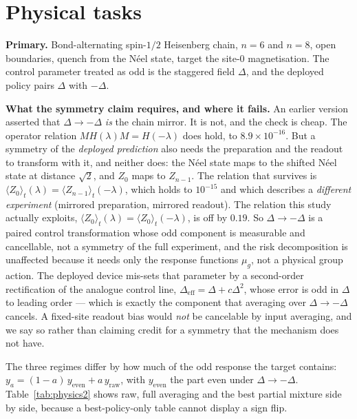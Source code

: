 \documentclass{article}
\begin{document}
\section{Physical tasks}
\label{sec:physics}

\textbf{Primary.} Bond-alternating spin-$1/2$ Heisenberg chain, $n=6$ and $n=8$, open boundaries,
quench from the N\'eel state, target the site-0 magnetisation. The control parameter treated as odd
is the staggered field $\Delta$, and the deployed policy pairs $\Delta$ with $-\Delta$.

\textbf{What the symmetry claim requires, and where it fails.} An earlier version asserted that
$\Delta\to-\Delta$ \emph{is} the chain mirror. It is not, and the check is cheap. The operator
relation $M H(\lambda) M = H(-\lambda)$ does hold, to $8.9\times10^{-16}$. But a symmetry of the
\emph{deployed prediction} also needs the preparation and the readout to transform with it, and
neither does: the N\'eel state maps to the shifted N\'eel state at distance $\sqrt{2}$, and
$Z_0$ maps to $Z_{n-1}$. The relation that survives is
$\langle Z_0\rangle_t(\lambda)=\langle Z_{n-1}\rangle_t(-\lambda)$, which holds to $10^{-15}$ and which describes a
\emph{different experiment} (mirrored preparation, mirrored readout). The relation this study
actually exploits, $\langle Z_0\rangle_t(\lambda)=\langle Z_0\rangle_t(-\lambda)$, is off by $0.19$. So
$\Delta\to-\Delta$ is a paired control transformation whose odd component is measurable and
cancellable, not a symmetry of the full experiment, and the risk decomposition is unaffected because
it needs only the response functions $\mu_g$, not a physical group action. The deployed device mis-sets that parameter by a second-order rectification of
the analogue control line, $\Delta_{\mathrm{eff}}=\Delta+c\Delta^2$, whose error is odd in $\Delta$
to leading order --- which is exactly the component that averaging over $\Delta\to-\Delta$ cancels.
A fixed-site readout bias would \emph{not} be cancelable by input averaging, and we say so rather
than claiming credit for a symmetry that the mechanism does not have.

The three regimes differ by how much of the odd response the target contains:
$y_a=(1-a)\,y_{\mathrm{even}}+a\,y_{\mathrm{raw}}$, with $y_{\mathrm{even}}$ the part even under
$\Delta\to-\Delta$. Table~\ref{tab:physics2} shows raw, full averaging and the best partial mixture
side by side, because a best-policy-only table cannot display a sign flip.




\end{document}
